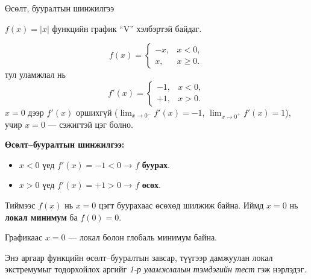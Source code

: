 \begin{frame}[allowframebreaks]{Өсөлт, бууралтын шинжилгээ}
\begin{example}
$f(x)=|x|$ функцийн график “V” хэлбэртэй байдаг. 

\[
f(x)=
\begin{cases}
 -x, & x<0,\\[3pt]
  x, & x\ge 0.
\end{cases}
\]
тул уламжлал нь
\[
f'(x)=
\begin{cases}
 -1, & x<0,\\[3pt]
 +1, & x>0.
\end{cases}
\]
$x=0$ дээр $f'(x)$ оршихгүй ($\lim_{x\to0^-}f'(x)=-1$, $\lim_{x\to0^+}f'(x)=1$), учир $x=0$ — сэжигтэй цэг болно.

\textbf{Өсөлт–бууралтын шинжилгээ:}
\begin{itemize}
  \item $x<0$ үед $f'(x)=-1<0$ → $f$ \textbf{буурах}.
  \item $x>0$ үед $f'(x)=+1>0$ → $f$ \textbf{өсөх}.
\end{itemize}

Тиймээс $f(x)$ нь $x=0$ цэгт буурахаас өсөхөд шилжиж байна.
Иймд $x=0$ нь \textbf{локал минимум} ба $f(0)=0$.
\begin{center}
\begin{fitbox}\end{fitbox}
\end{center}
Графикаас $x=0$ — локал болон глобаль минимум байна.
\end{example}

Энэ аргаар функцийн өсөлт–бууралтын завсар, түүгээр дамжуулан локал экстремумыг тодорхойлох аргийг \emph{1-р уламжлалын тэмдэгийн тест} гэж нэрлэдэг.
\end{frame}

